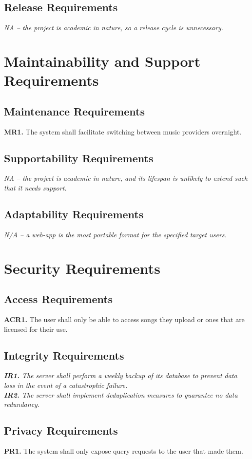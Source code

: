 \documentclass[12pt]{article}
\begin{document}
\subsection{Release Requirements}
\emph{NA -- the project is academic in nature, so a release cycle is unnecessary.}

\section{Maintainability and Support Requirements}
\subsection{Maintenance Requirements}
\textbf{MR1.} The system shall facilitate switching between music providers overnight.
\subsection{Supportability Requirements}
\emph{NA -- the project is academic in nature, and its lifespan is unlikely to extend such that it needs support.}
\subsection{Adaptability Requirements}
\emph{N/A -- a web-app is the most portable format for the specified target users.}

\section{Security Requirements}
\subsection{Access Requirements}
\textbf{ACR1.} The user shall only be able to access songs they upload or ones that are licensed for their use.
\subsection{Integrity Requirements}
\emph{\textbf{IR1.} The server shall perform a weekly backup of its database to prevent data loss in the event of a catastrophic failure.} \\
\emph{\textbf{IR2.} The server shall implement deduplication measures to guarantee no data redundancy.}
\subsection{Privacy Requirements}
\textbf{PR1.} The system shall only expose query requests to the user that made them.
\end{document}
